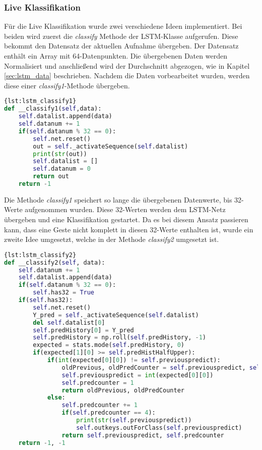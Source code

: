 \subsubsection*{Live Klassifikation}
Für die Live Klassifikation wurde zwei verschiedene Ideen implementiert. 
Bei beiden wird zuerst die \textit{classify} Methode der LSTM-Klasse 
aufgerufen. Diese bekommt den Datensatz der aktuellen Aufnahme übergeben. 
Der Datensatz enthält ein Array mit 64-Datenpunkten. Die übergebenen Daten werden 
Normalisiert und anschließend wird der Durchschnitt abgezogen, wie in Kapitel 
\autoref{sec:lstm_data} beschrieben. Nachdem die Daten vorbearbeitet wurden, 
werden diese einer \textit{classify1}-Methode übergeben. 
\begin{lstlisting}[language=Python,caption={Classify
Variante 1},label={lst:lstm_classify1}]{lst:lstm_classify1}
def __classify1(self,data):
	self.datalist.append(data)
	self.datanum += 1
	if(self.datanum % 32 == 0):
		self.net.reset()
		out = self._activateSequence(self.datalist)
		print(str(out))
		self.datalist = []
		self.datanum = 0
		return out
	return -1
\end{lstlisting}

Die Methode \textit{classify1} speichert so lange die übergebenen Datenwerte, 
bis 32-Werte aufgenommen wurden. Diese 32-Werten werden dem \ac{LSTM}-Netz 
übergeben und eine Klassifikation gestartet. Da es bei diesem Ansatz passieren kann, 
dass eine Geste nicht komplett in diesen 32-Werte enthalten ist, wurde ein zweite 
Idee umgesetzt, welche in der Methode \textit{classify2} umgesetzt ist.

\begin{lstlisting}[language=Python,caption={Classify
Variante 2},label={lst:lstm_classify2}]{lst:lstm_classify2}
def __classify2(self, data):
	self.datanum += 1
	self.datalist.append(data)
	if(self.datanum % 32 == 0):
		self.has32 = True
	if(self.has32):
		self.net.reset()
		Y_pred = self._activateSequence(self.datalist)
		del self.datalist[0]
		self.predHistory[0] = Y_pred
		self.predHistory = np.roll(self.predHistory, -1)
		expected = stats.mode(self.predHistory, 0)
		if(expected[1][0] >= self.predHistHalfUpper):
			if(int(expected[0][0]) != self.previouspredict):
				oldPrevious, oldPredCounter = self.previouspredict, self.previouspredict
				self.previouspredict = int(expected[0][0])
				self.predcounter = 1
				return oldPrevious, oldPredCounter
			else:
				self.predcounter += 1
				if(self.predcounter == 4):
					print(str(self.previouspredict))
					self.outkeys.outForClass(self.previouspredict)
				return self.previouspredict, self.predcounter
	return -1, -1
\end{lstlisting}


